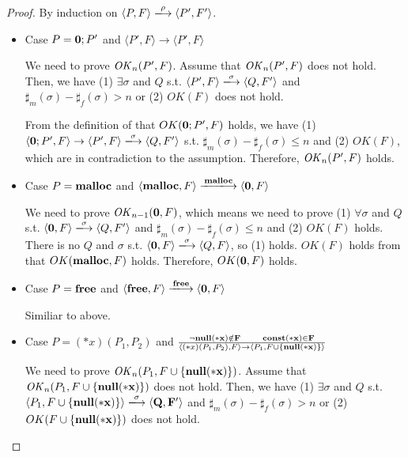 \begin{proof}
By induction on \(\langle P, F \rangle \xlongrightarrow{\rho} \langle P', F' \rangle \).

\begin{itemize}

\item Case \(P = {\bf 0};P'\) and \( \langle P', F \rangle \rightarrow \langle P', F \rangle\)

  We need to prove \(\mathit{OK}_n(P', F)\).  Assume that \(\mathit{OK}_n(P', F)\)
  does not hold. Then, we have (1) \( \exists \sigma \) and \(Q\) s.t. \(
  \langle P', F \rangle \xlongrightarrow{\sigma} \langle Q, F' \rangle
  \) and \(\sharp_{m}(\sigma) - \sharp_{f}(\sigma) > n\) or (2) \(
  OK(F)\) does not hold.

  From the definition of that \(OK({\bf 0};P', F)\) holds, we have (1)
  \( \langle {\bf 0};P', F \rangle \rightarrow \langle P', F \rangle
  \xlongrightarrow{\sigma} \langle Q, F' \rangle \) s.t.
  \(\sharp_m(\sigma) - \sharp_f(\sigma) \le n \) and (2) \(OK(F)\),
  which are in contradiction to the assumption. Therefore, \(\mathit{OK}_n(P',
  F)\) holds.

\item Case \(P = \mathbf{malloc}\) and \( \langle \Malloc, F \rangle \xlongrightarrow{\Malloc} \langle {\bf 0}, F \rangle\)

  We need to prove \(\mathit{OK}_{n-1}({\bf 0}, F)\), which means we need to
  prove (1) \( \forall \sigma \) and \(Q\) s.t. \( \langle {\bf 0}, F
  \rangle \xlongrightarrow{\sigma} \langle Q, F' \rangle \) and
  \(\sharp_{m}(\sigma) - \sharp_{f}(\sigma) \le n\) and (2) \( OK(F)\)
  holds.  There is no \(Q\) and \(\sigma\) s.t. \(\langle {\bf 0}, F
  \rangle \xlongrightarrow{\sigma} \langle Q, F \rangle \), so (1)
  holds.  \(OK(F)\) holds from that \(OK(\mathbf{malloc}, F)\)
  holds. Therefore, \(OK({\bf 0}, F)\) holds.
  
\item Case \(P = \mathbf{free}\) and \(\langle \Free, F \rangle \xlongrightarrow{\Free} \langle {\bf 0}, F \rangle \)

  Similiar to above.

\item Case \( P = (*x)(P_1,P_2) \) and \( \frac{\neg\bf{null}(*x) \notin F
      \quad\quad \mathbf{const}(*x) \in F} { \langle (*x)(P_1, P_2), F \rangle
      \rightarrow \langle P_1, F\cup \{\bf{null}(*x) \} \rangle } \) 

  We need to prove \(\mathit{OK}_n(P_1, F\cup\{\bf{null}(*x)\})\).  Assume that
  \(\mathit{OK}_n(P_1, F\cup\{\bf{null}(*x)\})\) does not hold. Then, we have (1) \(
  \exists \sigma \) and \(Q\) s.t. \( \langle P_1, F\cup\{\snull\}
  \rangle \xlongrightarrow{\sigma} \langle Q, F' \rangle \) and
  \(\sharp_{m}(\sigma) - \sharp_{f}(\sigma) > n\) or (2) \(
  OK(F\cup\{\bf{null}(*x)\})\) does not hold.


\end{itemize}
\end{proof}
